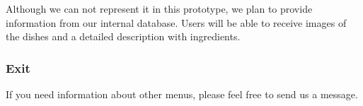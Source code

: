 Although we can not represent it in this prototype, we plan to provide information from our internal database. Users will be able to receive images of the dishes and a detailed description with ingredients.

\subsubsection{Exit}
If you need information about other menus, please feel free to send us a message.